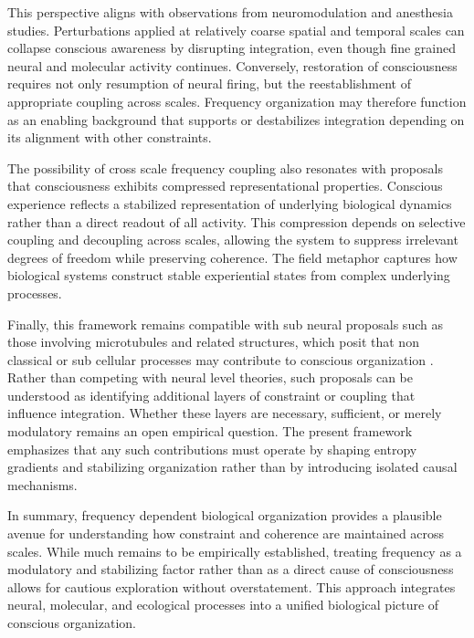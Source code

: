 \documentclass[12pt,letterpaper]{article}
\begin{document}
This perspective aligns with observations from neuromodulation and anesthesia studies. Perturbations applied at relatively coarse spatial and temporal scales can collapse conscious awareness by disrupting integration, even though fine grained neural and molecular activity continues. Conversely, restoration of consciousness requires not only resumption of neural firing, but the reestablishment of appropriate coupling across scales. Frequency organization may therefore function as an enabling background that supports or destabilizes integration depending on its alignment with other constraints.

The possibility of cross scale frequency coupling also resonates with proposals that consciousness exhibits compressed representational properties. Conscious experience reflects a stabilized representation of underlying biological dynamics rather than a direct readout of all activity. This compression depends on selective coupling and decoupling across scales, allowing the system to suppress irrelevant degrees of freedom while preserving coherence. The field metaphor captures how biological systems construct stable experiential states from complex underlying processes.

Finally, this framework remains compatible with sub neural proposals such as those involving microtubules and related structures, which posit that non classical or sub cellular processes may contribute to conscious organization \cite{penrose2014}. Rather than competing with neural level theories, such proposals can be understood as identifying additional layers of constraint or coupling that influence integration. Whether these layers are necessary, sufficient, or merely modulatory remains an open empirical question. The present framework emphasizes that any such contributions must operate by shaping entropy gradients and stabilizing organization rather than by introducing isolated causal mechanisms.

In summary, frequency dependent biological organization provides a plausible avenue for understanding how constraint and coherence are maintained across scales. While much remains to be empirically established, treating frequency as a modulatory and stabilizing factor rather than as a direct cause of consciousness allows for cautious exploration without overstatement. This approach integrates neural, molecular, and ecological processes into a unified biological picture of conscious organization.
\end{document}
